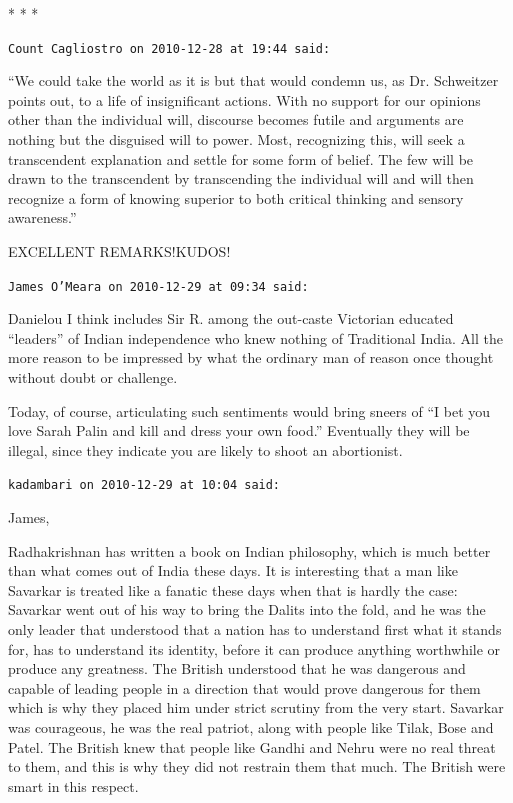 \begin{center}* * *\end{center}

\begin{footnotesize}
\begin{sffamily}
\texttt{Count Cagliostro on 2010-12-28 at 19:44 said:}

``We could take the world as it is but that would condemn us, as Dr. Schweitzer points out, to a life of insignificant actions. With no support for our opinions other than the individual will, discourse becomes futile and arguments are nothing but the disguised will to power. Most, recognizing this, will seek a transcendent explanation and settle for some form of belief. The few will be drawn to the transcendent by transcending the individual will and will then recognize a form of knowing superior to both critical thinking and sensory awareness.''

EXCELLENT REMARKS!KUDOS!

\hfill

\texttt{James O'Meara on 2010-12-29 at 09:34 said:}

Danielou I think includes Sir R. among the out-caste Victorian educated ``leaders'' of Indian independence who knew nothing of Traditional India. All the more reason to be impressed by what the ordinary man of reason once thought without doubt or challenge.

Today, of course, articulating such sentiments would bring sneers of ``I bet you love Sarah Palin and kill and dress your own food.'' Eventually they will be illegal, since they indicate you are likely to shoot an abortionist.

\hfill

\texttt{kadambari on 2010-12-29 at 10:04 said:}

James,

Radhakrishnan has written a book on Indian philosophy, which is much better than what comes out of India these days. It is interesting that a man like Savarkar is treated like a fanatic these days when that is hardly the case: Savarkar went out of his way to bring the Dalits into the fold, and he was the only leader that understood that a nation has to understand first what it stands for, has to understand its identity, before it can produce anything worthwhile or produce any greatness. The British understood that he was dangerous and capable of leading people in a direction that would prove dangerous for them which is why they placed him under strict scrutiny from the very start. Savarkar was courageous, he was the real patriot, along with people like Tilak, Bose and Patel. The British knew that people like Gandhi and Nehru were no real threat to them, and this is why they did not restrain them that much. The British were smart in this respect.


\end{sffamily}
\end{footnotesize}
